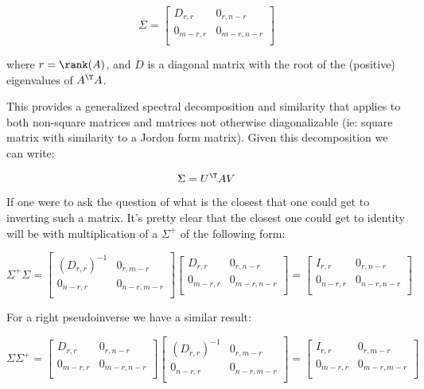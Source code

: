 \[
\Sigma = 
\begin{bmatrix}
D_{r,r} & 0_{r,n-r} \\
0_{m-r,r} & 0_{m-r,n-r} \\
\end{bmatrix}
\]

where $r = \rank(A)$, and $D$ is a diagonal matrix with the root of the (positive) eigenvalues of $A^\T A$.

This provides a generalized spectral decomposition and similarity that applies to both non-square matrices and matrices not otherwise diagonalizable
(ie: square matrix with similarity to a Jordon form matrix).  Given this decomposition we can write:

\[
\Sigma = U^\T A V
\]

If one were to ask the question of what is the closest that one could get to inverting such a matrix.  It's pretty clear that the closest one could get to
identity will be with multiplication of a $\Sigma^{+}$ of the following form:

\[
\Sigma^{+} \Sigma
=
\begin{bmatrix}
(D_{r,r})^{-1} & 0_{r,m-r} \\
0_{n-r,r} & 0_{n-r,m-r} \\
\end{bmatrix}
\begin{bmatrix}
D_{r,r} & 0_{r,n-r} \\
0_{m-r,r} & 0_{m-r,n-r} \\
\end{bmatrix}
=
\begin{bmatrix}
I_{r,r} & 0_{r,n-r} \\
0_{n-r,r} & 0_{n-r,n-r} \\
\end{bmatrix}
\]

For a right pseudoinverse we have a similar result:

\[
\Sigma
\Sigma^{+}
=
\begin{bmatrix}
D_{r,r} & 0_{r,n-r} \\
0_{m-r,r} & 0_{m-r,n-r} \\
\end{bmatrix}
\begin{bmatrix}
(D_{r,r})^{-1} & 0_{r,m-r} \\
0_{n-r,r} & 0_{n-r,m-r} \\
\end{bmatrix}
=
\begin{bmatrix}
I_{r,r} & 0_{r,m-r} \\
0_{m-r,r} & 0_{m-r,m-r} \\
\end{bmatrix}
\]

